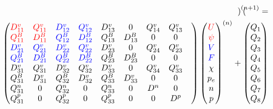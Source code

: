 \begin{eqnarray}
\begin{pmatrix}
  \end{pmatrix}^{(n+1)} = \nonumber \\
  \begin{pmatrix}
    \textcolor{red}{D^v_{1 1}} & \textcolor{red}{Q^v_{1 1}} &
    \textcolor{blue}{D^v_{1 2}} & \textcolor{blue}{Q^v_{1 2}} & 
          D^v_{1 3}  &        0         &
          Q^v_{1 4}  &       Q^v_{1 3}
    \\
    \textcolor{red}{Q^B_{1 1}} & \textcolor{red}{D^B_{1 1}} &
    \textcolor{blue}{Q^B_{1 2}} & \textcolor{blue}{D^B_{1 2}} & 
          Q^B_{1 3}  &       D^B_{1 3}  &
              0      &        0
    \\
    \textcolor{blue}{D^v_{2 1}} & \textcolor{blue}{Q^v_{2 1}} & 
    \textcolor{blue}{D^v_{2 2}} & \textcolor{blue}{Q^v_{2 2}} & 
          D^v_{2 3}  &        0         &
	  Q^v_{2 4}  &       Q^v_{2 3}
    \\
    \textcolor{blue}{Q^B_{2 1}} & \textcolor{blue}{D^B_{2 1}} &
    \textcolor{blue}{Q^B_{2 2}} & \textcolor{blue}{D^B_{2 2}} & 
          Q^B_{2 3}  &       D^B_{2 3}  &
              0      &        0
    \\
          D^v_{3 1}  &       Q^v_{3 1}  &
          D^v_{3 2}  &       Q^v_{3 2}  &
          D^v_{3 3}  &        0         &
	  Q^v_{3 4}  &       Q^v_{3 3}  
    \\
          Q^B_{3 1}  &       D^v_{3 1}  &
          Q^B_{3 2}  &       D^v_{3 2}  &
          Q^B_{3 3}  &       D^v_{3 3}  &
              0      &        0
    \\
          Q^n_{3 1}  &        0         &
          Q^n_{3 2}  &        0         &
          Q^n_{3 3}  &        0         &
          D^n        &        0
    \\
          Q^p_{3 1}  &        0         &
          Q^p_{3 2}  &        0         &
          Q^p_{3 3}  &        0         &
              0      &       D^p        &
  \end{pmatrix}
  \begin{pmatrix}
    \textcolor{red}{U}\\ \textcolor{red}{\psi}\\ 
    \textcolor{blue}{V}\\ \textcolor{blue}{F}   \\
    \chi \\ p_e \\ 
    n \\ p
  \end{pmatrix}^{(n)} +   
  \begin{pmatrix}
    Q_1 \\ Q_2 \\ 
    Q_3 \\ Q_4 \\
    Q_5 \\ Q_6 \\ 
    Q_7 \\ Q_8
  \end{pmatrix}
\end{eqnarray}

